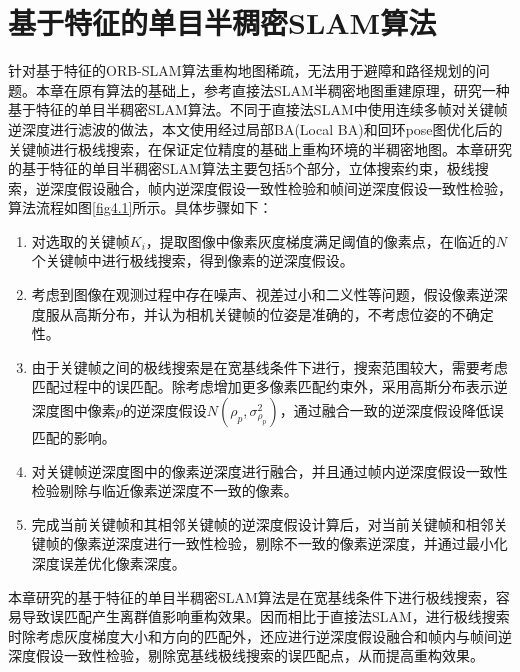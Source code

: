 
\chapter{基于特征的单目半稠密SLAM算法}
\label{chap:Semi-Dense}

针对基于特征的ORB-SLAM算法重构地图稀疏，无法用于避障和路径规划的问题。本章在原有算法的基础上，参考直接法SLAM半稠密地图重建原理，研究一种基于特征的单目半稠密SLAM算法。不同于直接法SLAM中使用连续多帧对关键帧逆深度进行滤波的做法，本文使用经过局部BA(Local BA)和回环pose图优化后的关键帧进行极线搜索，在保证定位精度的基础上重构环境的半稠密地图。本章研究的基于特征的单目半稠密SLAM算法主要包括5个部分，立体搜索约束，极线搜索，逆深度假设融合，帧内逆深度假设一致性检验和帧间逆深度假设一致性检验，算法流程如图\ref{fig4.1}所示。具体步骤如下：
\begin{enumerate}[label={(\arabic*)}]

\item 对选取的关键帧$K_i$，提取图像中像素灰度梯度满足阈值的像素点，在临近的$N$个关键帧中进行极线搜索，得到像素的逆深度假设。

\item 考虑到图像在观测过程中存在噪声、视差过小和二义性等问题，假设像素逆深度服从高斯分布\upcite{[4.1]}，并认为相机关键帧的位姿是准确的，不考虑位姿的不确定性。

\item 由于关键帧之间的极线搜索是在宽基线条件下进行，搜索范围较大，需要考虑匹配过程中的误匹配。除考虑增加更多像素匹配约束外，采用高斯分布表示逆深度图中像素$p$的逆深度假设$N(\rho_p, \sigma_{\rho_p}^2)$，通过融合一致的逆深度假设降低误匹配的影响。

\item 对关键帧逆深度图中的像素逆深度进行融合，并且通过帧内逆深度假设一致性检验剔除与临近像素逆深度不一致的像素。

\item 完成当前关键帧和其相邻关键帧的逆深度假设计算后，对当前关键帧和相邻关键帧的像素逆深度进行一致性检验，剔除不一致的像素逆深度，并通过最小化深度误差优化像素深度。

\end{enumerate}

本章研究的基于特征的单目半稠密SLAM算法是在宽基线条件下进行极线搜索，容易导致误匹配产生离群值影响重构效果。因而相比于直接法SLAM，进行极线搜索时除考虑灰度梯度大小和方向的匹配外，还应进行逆深度假设融合和帧内与帧间逆深度假设一致性检验，剔除宽基线极线搜索的误匹配点，从而提高重构效果。

